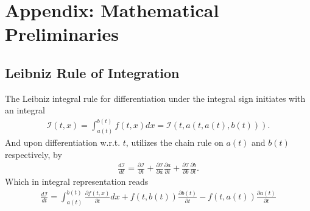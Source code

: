 \appendix
\section{Appendix: Mathematical Preliminaries}
\subsection{Leibniz Rule of Integration}
\label{appendix:leibniz}
The Leibniz integral rule for differentiation under the integral sign
initiates with an integral
\begin{align}
    \mathcal{I}(t, x) = \int_{a(t)}^{b(t)} f(t, x) dx = \mathcal{I}(t, a(t,
    a(t), b(t))).
\end{align}
And upon differentiation w.r.t. $t$, utilizes the chain rule on $a(t)$ and
$b(t)$ respectively, by
\begin{align}
    \frac{d\mathcal{I}}{dt} =
    \frac{\partial \mathcal{I}}{\partial t}+
    \frac{\partial \mathcal{I}}{\partial a}\frac{\partial a}{\partial t}+
    \frac{\partial \mathcal{I}}{\partial b}\frac{\partial b}{\partial t}.
\end{align}
Which in integral representation reads
\begin{align}
    \frac{d\mathcal{I}}{dt} = \int_{a(t)}^{b(t)}\frac{\partial f(t,
    x)}{\partial t} dx + f(t, b(t)) \frac{\partial b(t)}{\partial t}
    - f(t, a(t)) \frac{\partial a(t)}{\partial t}
\end{align}

